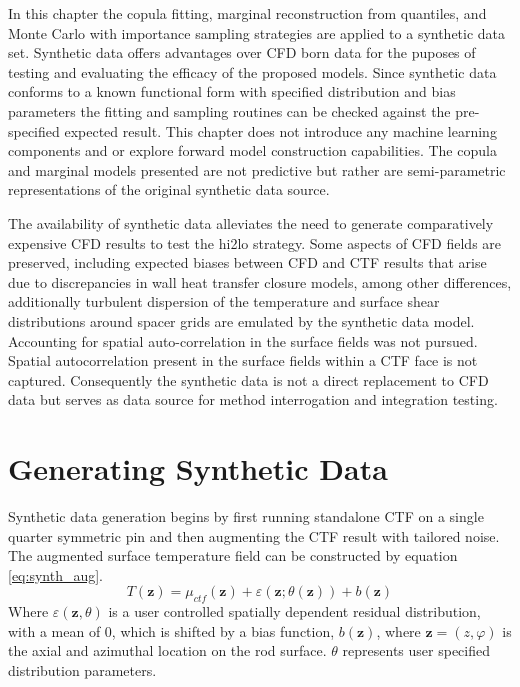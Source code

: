 
In this chapter the copula fitting, marginal reconstruction from quantiles, and Monte Carlo with importance sampling strategies are applied to a synthetic data set.  Synthetic data offers advantages over CFD born data for the puposes of testing and evaluating the efficacy of the proposed models.  Since synthetic data conforms to a known functional form with specified distribution and bias parameters the fitting and sampling routines can be checked against the pre-specified expected result.
This chapter does not introduce any machine learning components and or explore forward model construction capabilities. The copula and marginal models presented are not predictive but rather are semi-parametric representations of the original synthetic data source.

The availability of synthetic data alleviates the need to generate comparatively expensive CFD results to test the hi2lo strategy.  Some aspects of CFD fields are preserved, including expected biases between CFD and CTF results that arise due to discrepancies in wall heat transfer closure models, among other differences, additionally turbulent dispersion of the temperature and surface shear distributions around spacer grids are emulated by the synthetic data model.  Accounting for spatial auto-correlation in the surface fields was not pursued.  Spatial autocorrelation present in the surface fields within a CTF face is not captured.  Consequently the synthetic data is not a direct replacement to CFD data but serves as data source for method interrogation and integration testing.


\section{Generating Synthetic Data}

Synthetic data generation begins by first running standalone CTF on a single quarter symmetric pin and then augmenting the CTF result with tailored noise.  The augmented surface temperature field can be constructed by equation \ref{eq:synth_aug}.
\begin{equation}
    T(\mathbf z) = \mu_{ctf}(\mathbf z) + \varepsilon (\mathbf z; \theta(\mathbf z)) +  b(\mathbf z)
\label{eq:synth_aug}
\end{equation}
Where $\varepsilon(\mathbf z, \theta)$ is a user controlled spatially dependent residual distribution, with a mean of 0, which is
shifted by a bias function,
$ b(\mathbf z)$, where $\mathbf z=(z, \varphi)$ is the axial and azimuthal location on the rod surface.
$\theta$ represents user specified distribution parameters.

